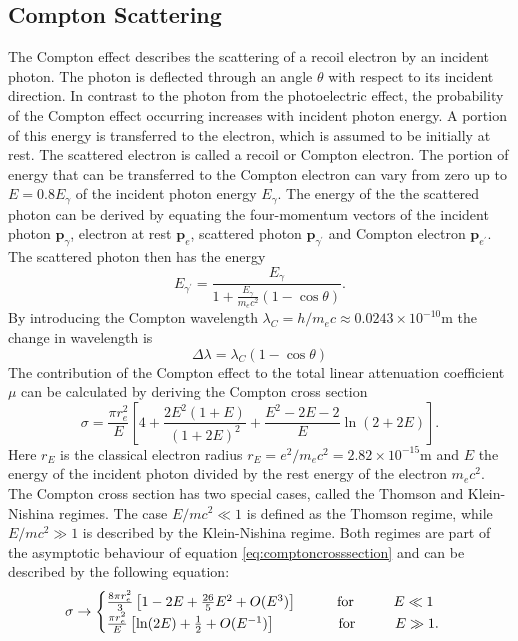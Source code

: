 \subsection{Compton Scattering}
The Compton effect describes the scattering of a recoil electron by an incident photon. The photon is deflected through an angle $\theta$ with respect to its incident direction. In contrast to the photon from the photoelectric effect, the probability of the Compton effect occurring increases with incident photon energy. A portion of this energy is transferred to the electron, which is assumed to be initially at rest. The scattered electron is called a recoil or Compton electron. The portion of energy that can be transferred to the Compton electron can vary from zero up to $E=0.8 E_\gamma$ of the incident photon energy $E_\gamma$. The energy of the the scattered photon can be derived by equating the four-momentum vectors of the incident photon $\mathbf{p}_\gamma$, electron at rest $\mathbf{p}_e$, scattered photon $\mathbf{p}_{\gamma^\prime}$ and Compton electron $\mathbf{p}_{e^\prime}$. The scattered photon then has the energy
\begin{equation}
E_{\gamma^\prime} = \frac{E_\gamma}{1+\frac{E_\gamma}{m_ec^2}(1-\cos\theta)}.
\end{equation}
By introducing the Compton wavelength $\lambda_C = h/m_ec \approx 0.0243\times 10^{-10}$m the change in wavelength is
\begin{equation}
\Delta \lambda = \lambda_C(1-\cos\theta)
\end{equation}
The contribution of the Compton effect to the total linear attenuation coefficient $\mu$ can be calculated by deriving the Compton cross section \cite{Jauch}
\begin{equation}\label{eq:comptoncrosssection}
\sigma = \frac{\pi r_e^2}{E} \left[4+\frac{2E^2(1+E)}{(1+2E)^2}+\frac{E^2-2E-2}{E}\ln(2+2E)\right].
\end{equation}
Here $r_E$ is the classical electron radius $r_E = e^2/m_ec^2 = 2.82\times 10^{-15}$m and $E$ the energy of the incident photon divided by the rest energy of the electron $m_ec^2$.\\The Compton cross section has two special cases, called the Thomson and Klein-Nishina regimes. The case $E/mc^2 \ll 1$ is defined as the Thomson regime, while $E/mc^2 \gg 1$ is described by the Klein-Nishina regime. Both regimes are part of the asymptotic behaviour of equation \ref{eq:comptoncrosssection} \cite{Heitler} and can be described by the following equation:
\begin{equation}
\sigma \rightarrow\begin{cases}
\frac{8\pi r_e^2}{3}\left[1-2E+\frac{26}{5}E^2+O(E^3)\right]\hspace{1cm}\mathrm{for}\hspace{1cm}E\ll 1\\
\frac{\pi r_e^2}{E}\left[\ln(2E)+\frac{1}{2}+O(E^{-1})\right]\hspace{1.57cm}\mathrm{for}\hspace{1cm}E\gg 1.
\end{cases}
\end{equation}
